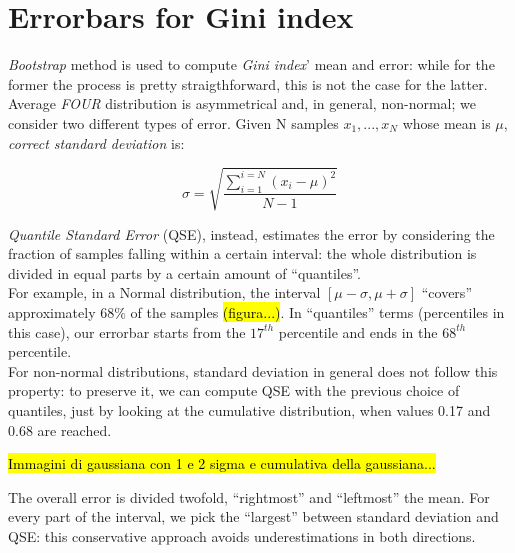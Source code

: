 \appendix
\section{Errorbars for Gini index}

\textit{Bootstrap} method\cite{bootstrap} is used to compute
\textit{Gini index}' mean and error: while for the former the process
is pretty straigthforward, this is not the case for the latter.
Average \textit{FOUR} distribution is asymmetrical and, in general,
non-normal; we consider two different types of error.
Given N samples ${x_1,...,x_N}$ whose mean is $\mu$,
\textit{correct standard deviation} is:

$$
\sigma=\sqrt{\frac{\sum_{i=1}^{i=N}(x_i - \mu)^2}{N-1}}
$$


\textit{Quantile Standard Error} (QSE)\cite{quantile}, instead,
estimates the error by considering the fraction of samples
falling within a certain interval: the whole distribution is
divided in equal parts by a certain amount of ``quantiles''.\\
For example, in a Normal distribution, the interval
$[\mu -\sigma, \mu +\sigma]$ ``covers'' approximately $68\%$
of the samples \hl{(figura...)}.
In ``quantiles'' terms (percentiles in this case), our errorbar
starts from the $17^{th}$ percentile and ends in the $68^{th}$
percentile.\\
For non-normal distributions, standard deviation in general does
not follow this property: to preserve it, we can compute QSE with
the previous choice of quantiles, just by looking at the cumulative
distribution, when values 0.17 and 0.68 are reached.

\hl{Immagini di gaussiana con 1 e 2 sigma e cumulativa della gaussiana...}

The overall error is divided twofold, ``rightmost'' and ``leftmost''
the mean. For every part of the interval, we pick the ``largest''
between standard deviation and QSE: this conservative approach avoids
underestimations in both directions.

